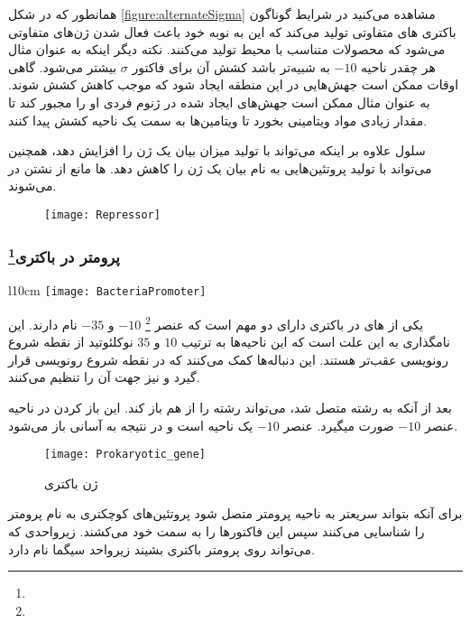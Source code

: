 همانطور که در شکل
\ref{figure:alternateSigma}
مشاهده می‌کنید در شرایط گوناگون باکتری
های متفاوتی تولید می‌کند که این به نوبه خود باعث فعال شدن ژن‌های متفاوتی می‌شود که محصولات متناسب با محیط تولید می‌کنند. نکته دیگر اینکه به عنوان مثال هر چقدر ناحیه
$-10$
به
شبیه‌تر باشد کشش آن برای فاکتور
$\sigma$
بیشتر می‌شود. گاهی اوقات ممکن است جهش‌هایی در این منطقه ایجاد شود که موجب کاهش کشش شوند. به عنوان مثال ممکن است جهش‌های ایجاد شده در ژنوم فردی او را مجبور کند تا مقدار زیادی مواد ویتامینی بخورد تا ویتامین‌ها به سمت یک ناحیه کشش پیدا کنند.

\pagebreak
سلول علاوه بر اینکه می‌تواند با تولید
میزان بیان یک ژن را افزایش دهد، همچنین می‌تواند با تولید پروتئین‌هایی به نام
بیان یک ژن را کاهش دهد.
ها مانع از نشتن
در
می‌شوند.

\begin{figure}[htbp]
\centering
\texttt{[image: Repressor]}
\end{figure}

\pagebreak
\subsubsection{پرومتر در باکتری\protect\footnote{}}

\begin{wrapfigure}[12]{l}{10cm}
\centering
\texttt{[image: BacteriaPromoter]}
\end{wrapfigure}

یکی از
های
در باکتری دارای دو
مهم است که عنصر
\footnote{}
$ -10 $
و
$ -35 $
نام دارند.
این نامگذاری به این علت است که این ناحیه‌ها به ترتیب
$ 10 $
و
$ 35 $
نوکلئوتید از نقطه شروع رونویسی عقب‌تر هستند. این دنباله‌ها کمک می‌کنند که
در نقطه شروع رونویسی قرار گیرد و نیز جهت آن را تنظیم می‌کنند.

بعد از آنکه
به رشته متصل شد، می‌تواند رشته
را از هم باز کند. این باز کردن در ناحیه عنصر
$ -10 $
صورت میگیرد. عنصر
$ -10 $
یک ناحیه
است و در نتیجه به آسانی باز می‌شود.
\cite{StagesOfTranscription}

\begin{figure}[htbp]
\centering
\texttt{[image: Prokaryotic\_gene]}
\caption{ژن باکتری}
\label{figure:prokaryoticGin}
\end{figure}

برای آنکه
بتواند سریعتر به ناحیه پرومتر متصل شود پروتئین‌های کوچکتری به نام
پرومتر را شناسایی می‌کنند سپس این فاکتورها
را به سمت خود می‌کشند. زیر‌واحدی که می‌تواند روی پرومتر باکتری بشیند زیرواحد سیگما نام دارد.

